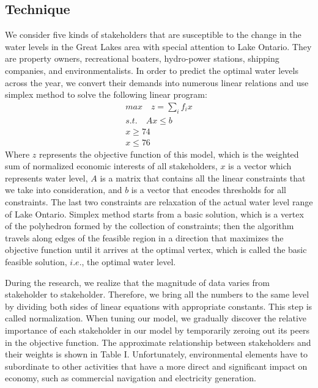 \documentclass[pre,12pt]{revtex4-1}
\begin{document}
\subsection{Technique}
We consider five kinds of stakeholders that are susceptible to the change in the water levels in the Great Lakes area with special attention to Lake Ontario. They are property owners, recreational boaters, hydro-power stations, shipping companies, and environmentalists. In order to predict the optimal water levels across the year, we convert their demands into numerous linear relations and use simplex method to solve the following linear program: \\ 
\begin{align}
    max\quad z = \sum_{i}{f_{i}x} \\
    s.t. \quad Ax \leq b \\
    x \geq 74 \\
    x \leq 76
\end{align}
Where $z$ represents the objective function of this model, which is the weighted sum of normalized economic interests of all stakeholders, $x$ is a vector which represents water level, $A$ is a matrix that contains all the linear constraints that we take into consideration, and $b$ is a vector that encodes thresholds for all constraints. The last two constraints are relaxation of the actual water level range of Lake Ontario. Simplex method starts from a basic solution, which is a vertex of the polyhedron formed by the collection of constraints; then the algorithm travels along edges of the feasible region in a direction that maximizes the objective function until it arrives at the optimal vertex, which is called the basic feasible solution, $i.e.$, the optimal water level. \par
During the research, we realize that the magnitude of data varies from stakeholder to stakeholder. Therefore, we bring all the numbers to the same level by dividing both sides of linear equations with appropriate constants. This step is called normalization. When tuning our model, we gradually discover the relative importance of each stakeholder in our model by temporarily zeroing out its peers in the objective function. The approximate relationship between stakeholders and their weights is shown in Table I. Unfortunately, environmental elements have to subordinate to other activities that have a more direct and significant impact on economy, such as commercial navigation and electricity generation. \\
\end{document}

